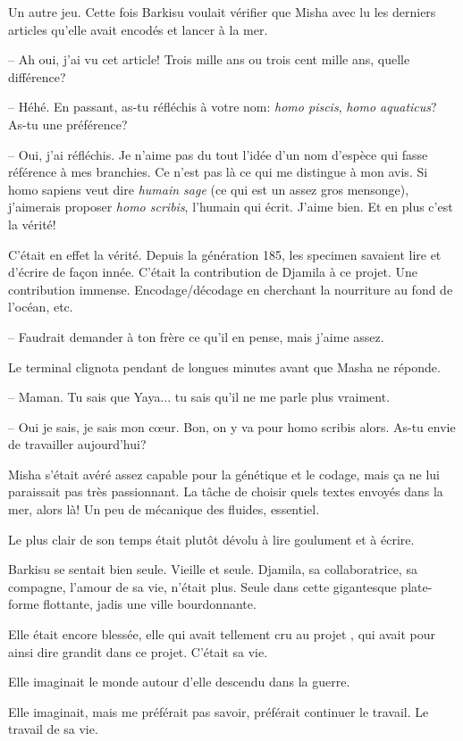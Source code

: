 Un autre jeu. 
%
Cette fois Barkisu voulait vérifier que Misha avec lu les derniers articles qu'elle avait
encodés et lancer à la mer.
%

-- Ah oui, j'ai vu cet article! Trois mille ans ou trois cent mille ans, quelle différence?

-- Héhé. En passant, as-tu réfléchis à votre nom: \textit{homo piscis}, \textit{homo aquaticus}? As-tu une préférence?

-- Oui, j'ai réfléchis. Je n'aime pas du tout l'idée d'un nom d'espèce qui fasse référence à mes branchies. Ce n'est pas là ce qui me distingue à mon avis. 
   Si homo sapiens veut dire \textit{humain sage} (ce qui est un assez gros mensonge), j'aimerais
   proposer \textit{homo scribis}, l'humain qui écrit. J'aime bien. Et en plus c'est la vérité!

C'était en effet la vérité. Depuis la génération 185, les specimen savaient lire et d'écrire de façon innée. C'était
la contribution de Djamila à ce projet. Une contribution immense. Encodage/décodage en cherchant la nourriture au fond de l'océan, etc.

-- Faudrait demander à ton frère ce qu'il en pense, mais j'aime assez.

Le terminal clignota pendant de longues minutes avant que Masha ne réponde. 

-- Maman. Tu sais que Yaya... tu sais qu'il ne me parle plus vraiment.

-- Oui je sais, je sais mon c\oe ur. Bon, on y va pour homo scribis alors. As-tu envie de travailler aujourd'hui?

Misha s'était avéré assez capable pour la génétique et le codage, mais ça ne lui paraissait pas très passionnant.
La tâche de choisir quels textes envoyés dans la mer, alors là!
Un peu de mécanique des fluides, essentiel.

Le plus clair de son temps était plutôt dévolu à lire goulument et à écrire.

Barkisu se sentait bien seule. Vieille et seule.
Djamila, sa collaboratrice, sa compagne, l'amour de sa vie, n'était plus.
Seule dans cette gigantesque plate-forme flottante, jadis une ville bourdonnante.

Elle était encore blessée, elle qui avait tellement cru au projet \nomProjet{},
qui avait pour ainsi dire grandit dans ce projet. C'était sa vie.

Elle imaginait le monde autour d'elle descendu dans la guerre.

Elle imaginait, mais me préférait pas savoir, préférait continuer le travail.
Le travail de sa vie. 

